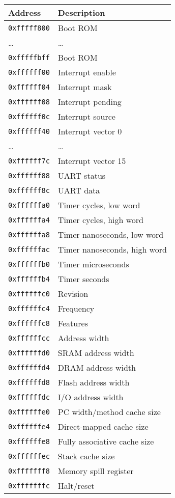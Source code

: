\documentclass[10pt,DIV12]{scrartcl}
\begin{document}
\begin{tabular}{ll}
  \toprule
  Address & Description \\
  \midrule
  \texttt{0xfffff800} & Boot ROM \\
  \ldots              & \ldots   \\
  \texttt{0xfffffbff} & Boot ROM \\
  \cmidrule{1-2}
  \texttt{0xffffff00} & Interrupt enable \\
  \texttt{0xffffff04} & Interrupt mask \\
  \texttt{0xffffff08} & Interrupt pending \\
  \texttt{0xffffff0c} & Interrupt source \\
  \texttt{0xffffff40} & Interrupt vector 0 \\
  \ldots              & \ldots   \\
  \texttt{0xffffff7c} & Interrupt vector 15 \\
  \cmidrule{1-2}
  \texttt{0xffffff88} & UART status \\
  \texttt{0xffffff8c} & UART data \\
  \cmidrule{1-2}
  \texttt{0xffffffa0} & Timer cycles, low word \\
  \texttt{0xffffffa4} & Timer cycles, high word \\
  \texttt{0xffffffa8} & Timer nanoseconds, low word \\
  \texttt{0xffffffac} & Timer nanoseconds, high word \\
  \texttt{0xffffffb0} & Timer microseconds \\
  \texttt{0xffffffb4} & Timer seconds \\
  \cmidrule{1-2}
  \texttt{0xffffffc0} & Revision \\
  \texttt{0xffffffc4} & Frequency \\
  \texttt{0xffffffc8} & Features \\
  \texttt{0xffffffcc} & Address width \\
  \texttt{0xffffffd0} & SRAM address width \\
  \texttt{0xffffffd4} & DRAM address width \\
  \texttt{0xffffffd8} & Flash address width \\
  \texttt{0xffffffdc} & I/O address width \\
  \texttt{0xffffffe0} & PC width/method cache size \\
  \texttt{0xffffffe4} & Direct-mapped cache size \\
  \texttt{0xffffffe8} & Fully associative cache size \\
  \texttt{0xffffffec} & Stack cache size \\
  \texttt{0xfffffff8} & Memory spill register \\
  \texttt{0xfffffffc} & Halt/reset \\
  \bottomrule
\end{tabular}
\end{document}
